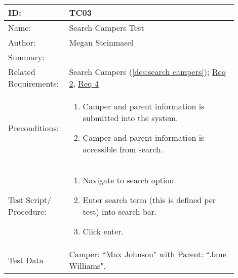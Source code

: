 \documentclass[11pt]{article}
\begin{document}
\begin{table}[H]
\begin{center}
\begin{tabular}{p{0.20\linewidth}p{0.70\linewidth}}
	ID: & TC03\\\hline
	Name: & Search Campers Test \\\hline
	Author: & Megan Steinmasel\\\hline
	Summary: &  \\\hline
	Related \hspace{5em} Requirements:& Search Campers (\cref{des:search campers}); \hyperlink{Req2}{Req 2}, \hyperlink{Req4}{Req 4}\\\hline
	Preconditions:& \begin{enumerate}[topsep=0pt]
		\item Camper and parent information is submitted into the system.
		\item Camper and parent information is accessible from search.
	\end{enumerate}\\\hline
	Test Script/ Procedure: & \begin{enumerate}[topsep=0pt]
	\item Navigate to search option.
	\item Enter search term (this is defined per test) into search bar.
	\item Click enter.
	\end{enumerate}\\\hline
	Test Data & Camper: ``Max Johnson" with Parent: ``Jane Williams".
\end{tabular}
\label{TC03}	
\end{center}
\end{table}
\end{document}
